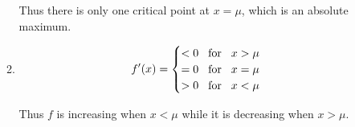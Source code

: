 \documentclass[12pt]{amsart}
\begin{document}
\begin{enumerate}
\begin{enumerate}
			Thus there is only one critical point at $x=\mu$, which is an absolute maximum.
																
			\item 
				\begin{align}
					f'(x)=
					\begin{cases}
						< 0 \hspace{0.3cm} \text{for} \hspace{0.3cm} x>\mu \notag \\
						= 0 \hspace{0.3cm} \text{for} \hspace{0.3cm} x=\mu \notag \\
						> 0 \hspace{0.3cm} \text{for} \hspace{0.3cm} x<\mu \notag
					\end{cases}
				\end{align}
				
			Thus $f$ is increasing when $x<\mu$ while it is decreasing when $x>\mu$.
			

\end{enumerate}
\end{enumerate}
\end{document}

